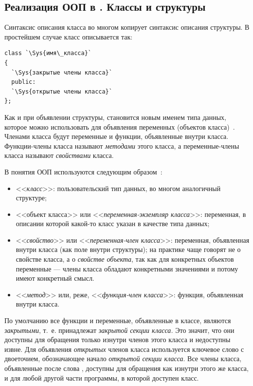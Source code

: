 \subsection[Реализация ООП в \Sys{C++}. Классы и структуры]{Реализация ООП в . Классы и структуры}
Синтаксис описания класса во многом копирует синтаксис описания структуры. В простейшем случае класс описывается  так:
\begin{lstlisting}
class `\Sys{имя\_класса}` 
{
  `\Sys{закрытые члены класса}`
  public:
  `\Sys{открытые члены класса}`
};
\end{lstlisting}

Как и при объявлении структуры,  становится новым именем типа данных, которое можно
использовать для объявления переменных (объектов класса)~\cite{OOP,OOPz}. %
Членами класса будут переменные и функции, объявленные
внутри класса. Функции-члены класса называют \emph{методами} этого класса, а переменные-члены класса
называют \emph{свойствами} класса.

В  понятия ООП используются следующим образом~\cite{OOP,OOPz}: %

\begin{itemize}
\item <<\emph{класс}>>: пользовательский тип данных, во многом аналогичный  структуре;
\item <<объект класса>> или <<\emph{переменная-экземпляр класса}>>: переменная, в описании которой какой-то
класс указан в качестве типа данных;
\item {}<<\emph{свойство}>> или <<\emph{переменная-член класса}>>: переменная, объявленная внутри класса (как поле внутри структуры);
на практике чаще говорят не о свойстве класса, а о \emph{свойстве объекта}, так как для конкретных
объектов переменные --- члены класса обладают конкретными значениями и потому имеют конкретный смысл.
\item <<\emph{метод}>> или, реже, <<\emph{функция-член класса}>>: функция, объявленная внутри класса.
\end{itemize}
По умолчанию все функции и переменные, объявленные в классе, являются \emph{закрытыми}, т.~е. принадлежат
\emph{закрытой секции класса.} Это значит, что они доступны для обращения только изнутри членов этого класса и
недоступны извне. Для объявления \emph{открытых} членов класса используется ключевое слово
 с двоеточием, обозначающее начало \emph{открытой секции класса}. Все члены
класса, объявленные после слова , доступны для обращения как изнутри этого же класса, и для
любой другой части программы, в которой доступен класс. 

